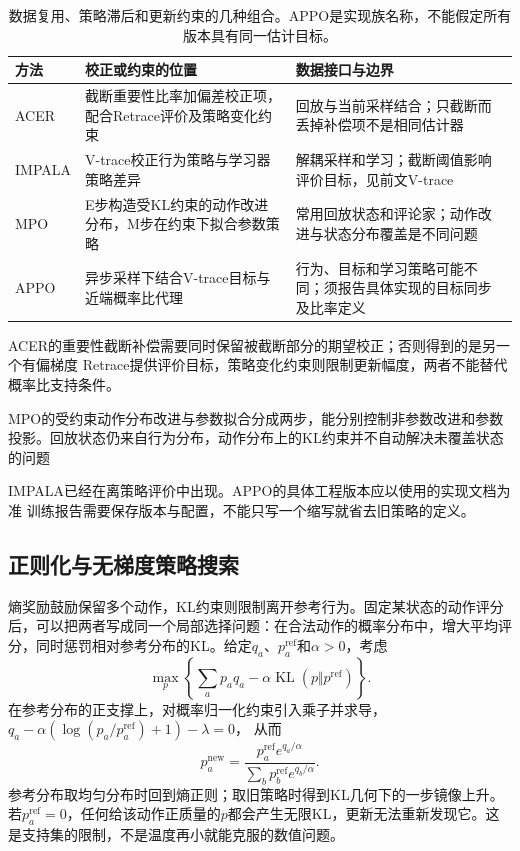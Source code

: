 \begin{table}[t]
  \centering
  \small
  \begin{tabularx}{\linewidth}{>{\raggedright\arraybackslash}p{17mm} >{\raggedright\arraybackslash}X >{\raggedright\arraybackslash}X}
    \toprule
    方法 & 校正或约束的位置 & 数据接口与边界 \\
    \midrule
    ACER & 截断重要性比率加偏差校正项，配合Retrace评价及策略变化约束 & 回放与当前采样结合；只截断而丢掉补偿项不是相同估计器 \\
    IMPALA & V-trace校正行为策略与学习器策略差异 & 解耦采样和学习；截断阈值影响评价目标，见前文V-trace \\
    MPO & E步构造受KL约束的动作改进分布，M步在约束下拟合参数策略 & 常用回放状态和评论家；动作改进与状态分布覆盖是不同问题 \\
    APPO & 异步采样下结合V-trace目标与近端概率比代理 & 行为、目标和学习策略可能不同；须报告具体实现的目标同步及比率定义 \\
    \bottomrule
  \end{tabularx}
  \caption{数据复用、策略滞后和更新约束的几种组合。APPO是实现族名称，不能假定所有版本具有同一估计目标。}
  \label{tab:rl-learning-off-policy-actors}
\end{table}

ACER的重要性截断补偿需要同时保留被截断部分的期望校正；否则得到的是另一个有偏梯度
Retrace提供评价目标，策略变化约束则限制更新幅度，两者不能替代概率比支持条件。

MPO的受约束动作分布改进与参数拟合分成两步，能分别控制非参数改进和参数投影。回放状态仍来自行为分布，动作分布上的KL约束并不自动解决未覆盖状态的问题

IMPALA已经在离策略评价中出现。APPO的具体工程版本应以使用的实现文档为准
训练报告需要保存版本与配置，不能只写一个缩写就省去旧策略的定义。

\subsection{正则化与无梯度策略搜索}
\label{sec:rl-learning-regularized-search}

熵奖励鼓励保留多个动作，KL约束则限制离开参考行为。固定某状态的动作评分后，可以把两者写成同一个局部选择问题：在合法动作的概率分布中，增大平均评分，同时惩罚相对参考分布的KL。给定$q_a$、$p_a^{\mathrm{ref}}$和$\alpha>0$，考虑
\[
  \max_p\left\{\sum_a p_a q_a
          -\alpha\operatorname{KL}(p\Vert p^{\mathrm{ref}})\right\}.
\]
在参考分布的正支撑上，对概率归一化约束引入乘子并求导，
$q_a-\alpha(\log(p_a/p_a^{\mathrm{ref}})+1)-\lambda=0$，
从而
\begin{equation}
  p_a^{\mathrm{new}}
     =\frac{p_a^{\mathrm{ref}}e^{q_a/\alpha}}
            {\sum_b p_b^{\mathrm{ref}}e^{q_b/\alpha}}.
  \label{eq:rl-learning-exponential-update}
\end{equation}
参考分布取均匀分布时回到熵正则；取旧策略时得到KL几何下的一步镜像上升。若$p_a^{\mathrm{ref}}=0$，任何给该动作正质量的$p$都会产生无限KL，更新无法重新发现它。这是支持集的限制，不是温度再小就能克服的数值问题。

